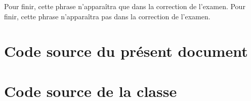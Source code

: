 \documentclass[addpoints,fr,biblatex,name,gradetable]{isae-exam}
\begin{document}
\ifprintanswers
  Pour finir, cette phrase n'apparaîtra que dans la correction de l'examen.
\else
  Pour finir, cette phrase n'apparaîtra pas dans la correction de l'examen.
\fi

\section{Code source du présent document}
\label{sec:code-source-doc}



\section{Code source de la classe}
\label{sec:code-source-classe}



\printbibliography
\end{document}

